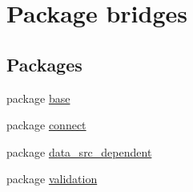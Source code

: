 \hypertarget{namespacebridges}{}\section{Package bridges}
\label{namespacebridges}
\subsection*{Packages}
\begin{DoxyCompactItemize}
\item 
package \hyperlink{namespacebridges_1_1base}{base}
\item 
package \hyperlink{namespacebridges_1_1connect}{connect}
\item 
package \hyperlink{namespacebridges_1_1data__src__dependent}{data\+\_\+src\+\_\+dependent}
\item 
package \hyperlink{namespacebridges_1_1validation}{validation}
\end{DoxyCompactItemize}
